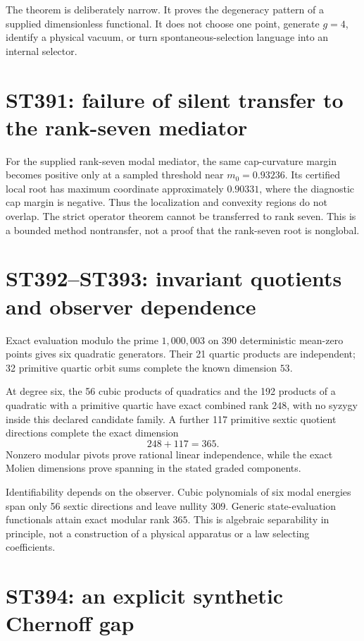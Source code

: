 \documentclass[11pt,a4paper]{article}
\begin{document}
The theorem is deliberately narrow.  It proves the degeneracy pattern of a supplied
dimensionless functional.  It does not choose one point, generate $g=4$, identify a
physical vacuum, or turn spontaneous-selection language into an internal selector.

\section{ST391: failure of silent transfer to the rank-seven mediator}

For the supplied rank-seven modal mediator, the same cap-curvature margin becomes
positive only at a sampled threshold near $m_0=0.93236$.  Its certified local root
has maximum coordinate approximately $0.90331$, where the diagnostic cap margin is
negative.  Thus the localization and convexity regions do not overlap.  The strict
operator theorem cannot be transferred to rank seven.  This is a bounded method
nontransfer, not a proof that the rank-seven root is nonglobal.

\section{ST392--ST393: invariant quotients and observer dependence}

Exact evaluation modulo the prime $1{,}000{,}003$ on 390 deterministic mean-zero
points gives six quadratic generators.  Their 21 quartic products are independent;
32 primitive quartic orbit sums complete the known dimension $53$.

At degree six, the 56 cubic products of quadratics and the 192 products of a
quadratic with a primitive quartic have exact combined rank $248$, with no syzygy
inside this declared candidate family.  A further 117 primitive sextic quotient
directions complete the exact dimension
\[
 248+117=365.
\]
Nonzero modular pivots prove rational linear independence, while the exact Molien
dimensions prove spanning in the stated graded components.

Identifiability depends on the observer.  Cubic polynomials of six modal energies
span only 56 sextic directions and leave nullity $309$.  Generic state-evaluation
functionals attain exact modular rank $365$.  This is algebraic separability in
principle, not a construction of a physical apparatus or a law selecting coefficients.

\section{ST394: an explicit synthetic Chernoff gap}
\end{document}

